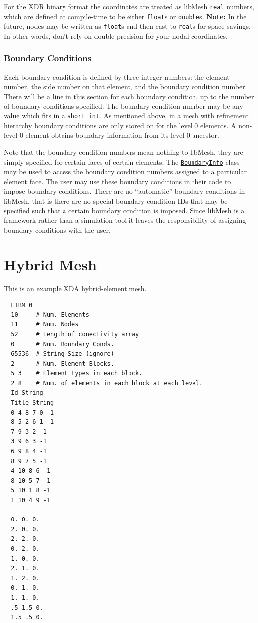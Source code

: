 \documentclass[12pt]{article}
\begin{document}
For the XDR binary format the coordinates are treated as libMesh \texttt{real} numbers, which are defined at compile-time to be either \texttt{float}s or \texttt{double}s.  \textbf{Note:} In the future, nodes may be written as \texttt{float}s and then cast to \texttt{real}s for space savings.  In other words, don't rely on double precision for your nodal coordinates.

\subsubsection{Boundary Conditions}
Each boundary condition is defined by three integer numbers:  the element number, the side number on that element, and the boundary condition number.  There will be a line in this section for each boundary condition, up to the number of boundary conditions specified.  The boundary condition number may be any value which fits in a \texttt{short int}. As mentioned above, in a mesh with refinement hierarchy boundary conditions are only stored on for the level 0 elements. A non-level 0 element obtains boundary information from its level 0 ancestor.

Note that the boundary condition numbers mean nothing to libMesh, they are simply specified for certain faces of certain elements.  The \href{http://libmesh.sourceforge.net/doxygen/classBoundaryInfo.html}{\texttt{BoundaryInfo}} class may be used to access the boundary condition numbers assigned to a particular element face.  The user may use these boundary conditions in their code to impose boundary conditions.  There are no ``automatic'' boundary conditions in libMesh, that is there are no special boundary condition IDs that may be specified such that a certain boundary condition is imposed.  Since libMesh is a framework rather than a simulation tool it leaves the responsibility of assigning boundary conditions with the user.

\clearpage
\appendix
\section{Hybrid Mesh}
This is an example XDA hybrid-element mesh.
\small
\begin{verbatim}
  LIBM 0
  10     # Num. Elements
  11     # Num. Nodes
  52     # Length of conectivity array
  0      # Num. Boundary Conds.
  65536  # String Size (ignore)
  2      # Num. Element Blocks.
  5 3    # Element types in each block.
  2 8    # Num. of elements in each block at each level.
  Id String
  Title String
  0 4 8 7 0 -1 
  8 5 2 6 1 -1 
  7 9 3 2 -1 
  3 9 6 3 -1 
  6 9 8 4 -1 
  8 9 7 5 -1 
  4 10 8 6 -1 
  8 10 5 7 -1 
  5 10 1 8 -1 
  1 10 4 9 -1 

  0. 0. 0.
  2. 0. 0.
  2. 2. 0.
  0. 2. 0.
  1. 0. 0.
  2. 1. 0.
  1. 2. 0.
  0. 1. 0.
  1. 1. 0.
  .5 1.5 0.
  1.5 .5 0.
\end{verbatim}
\normalsize
\end{document}
